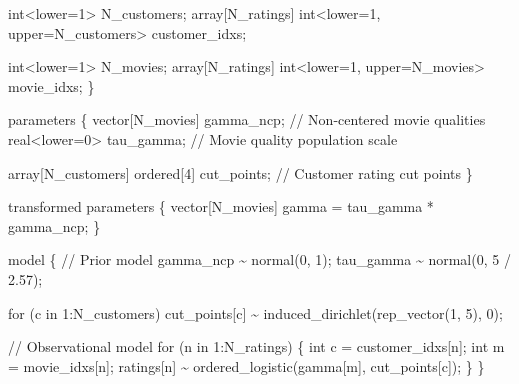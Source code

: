 \documentclass[
  letterpaper,
  DIV=11,
  numbers=noendperiod]{scrartcl}
\newenvironment{Shaded}{\begin{snugshade}}{\end{snugshade}}
\newcommand{\CommentTok}[1]{\textcolor[rgb]{0.37,0.37,0.37}{#1}}
\newcommand{\ControlFlowTok}[1]{\textcolor[rgb]{0.00,0.23,0.31}{#1}}
\newcommand{\DataTypeTok}[1]{\textcolor[rgb]{0.68,0.00,0.00}{#1}}
\newcommand{\DecValTok}[1]{\textcolor[rgb]{0.68,0.00,0.00}{#1}}
\newcommand{\FloatTok}[1]{\textcolor[rgb]{0.68,0.00,0.00}{#1}}
\newcommand{\KeywordTok}[1]{\textcolor[rgb]{0.00,0.23,0.31}{#1}}
\newcommand{\NormalTok}[1]{\textcolor[rgb]{0.00,0.23,0.31}{#1}}
\begin{document}
\begin{codelisting}
\begin{Shaded}
\begin{Highlighting}[]
  \DataTypeTok{int}\NormalTok{\textless{}}\KeywordTok{lower}\NormalTok{=}\DecValTok{1}\NormalTok{\textgreater{} N\_customers;}
  \DataTypeTok{array}\NormalTok{[N\_ratings] }\DataTypeTok{int}\NormalTok{\textless{}}\KeywordTok{lower}\NormalTok{=}\DecValTok{1}\NormalTok{, }\KeywordTok{upper}\NormalTok{=N\_customers\textgreater{} customer\_idxs;}

  \DataTypeTok{int}\NormalTok{\textless{}}\KeywordTok{lower}\NormalTok{=}\DecValTok{1}\NormalTok{\textgreater{} N\_movies;}
  \DataTypeTok{array}\NormalTok{[N\_ratings] }\DataTypeTok{int}\NormalTok{\textless{}}\KeywordTok{lower}\NormalTok{=}\DecValTok{1}\NormalTok{, }\KeywordTok{upper}\NormalTok{=N\_movies\textgreater{} movie\_idxs;}
\NormalTok{\}}

\KeywordTok{parameters}\NormalTok{ \{}
  \DataTypeTok{vector}\NormalTok{[N\_movies] gamma\_ncp; }\CommentTok{// Non{-}centered movie qualities}
  \DataTypeTok{real}\NormalTok{\textless{}}\KeywordTok{lower}\NormalTok{=}\DecValTok{0}\NormalTok{\textgreater{} tau\_gamma;    }\CommentTok{// Movie quality population scale}

  \DataTypeTok{array}\NormalTok{[N\_customers] }\DataTypeTok{ordered}\NormalTok{[}\DecValTok{4}\NormalTok{] cut\_points; }\CommentTok{// Customer rating cut points}
\NormalTok{\}}

\KeywordTok{transformed parameters}\NormalTok{ \{}
  \DataTypeTok{vector}\NormalTok{[N\_movies] gamma = tau\_gamma * gamma\_ncp;}
\NormalTok{\}}

\KeywordTok{model}\NormalTok{ \{}
  \CommentTok{// Prior model}
\NormalTok{  gamma\_ncp \textasciitilde{} normal(}\DecValTok{0}\NormalTok{, }\DecValTok{1}\NormalTok{);}
\NormalTok{  tau\_gamma \textasciitilde{} normal(}\DecValTok{0}\NormalTok{, }\DecValTok{5}\NormalTok{ / }\FloatTok{2.57}\NormalTok{);}

  \ControlFlowTok{for}\NormalTok{ (c }\ControlFlowTok{in} \DecValTok{1}\NormalTok{:N\_customers)}
\NormalTok{    cut\_points[c] \textasciitilde{} induced\_dirichlet(rep\_vector(}\DecValTok{1}\NormalTok{, }\DecValTok{5}\NormalTok{), }\DecValTok{0}\NormalTok{);}

  \CommentTok{// Observational model}
  \ControlFlowTok{for}\NormalTok{ (n }\ControlFlowTok{in} \DecValTok{1}\NormalTok{:N\_ratings) \{}
    \DataTypeTok{int}\NormalTok{ c = customer\_idxs[n];}
    \DataTypeTok{int}\NormalTok{ m = movie\_idxs[n];}
\NormalTok{    ratings[n] \textasciitilde{} ordered\_logistic(gamma[m], cut\_points[c]);}
\NormalTok{  \}}
\NormalTok{\}}


\end{Highlighting}
\end{Shaded}
\end{codelisting}
\end{document}
